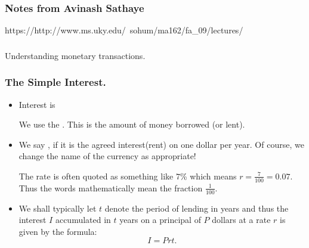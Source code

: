  \begin{frame}[fragile] \frametitle{Notes from Avinash Sathaye}
https://http://www.ms.uky.edu/~sohum/ma162/fa\_09/lectures/
\end{frame}

 \begin{frame}[fragile]\frametitle{}
\begin{center}
{\Large Understanding monetary transactions.}

\end{center}
\end{frame}


\begin{frame} %

  \frametitle{The Simple Interest.}
 \begin{itemize}%
\item 
Interest is  

We use the .
This is the amount of money borrowed (or lent).

\item
We say ,
if it is the agreed interest(rent)  on one dollar
per year. Of course, we change the name of the currency as appropriate!


The rate is often quoted as something like $7$\% which means
$r=\frac{7}{100} = 0.07$. Thus the words 
mathematically mean the fraction $\frac{1}{100}$.

\item We shall typically let $t$ denote the period of lending in years
and thus  the interest $I$ accumulated in $t$ years on a principal of
$P$ dollars at a rate $r$ is given by the formula:
$$I = Prt.$$




\end{itemize}
\end{frame}

%



